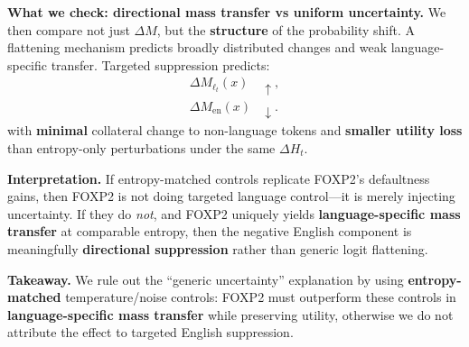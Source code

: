 \begin{itemize}[leftmargin=1.5em]
\begin{description}
\vspace{4pt}
\textbf{What we check: directional mass transfer vs uniform uncertainty.}
We then compare not just $\Delta M$, but the \textbf{structure} of the probability shift. A flattening mechanism predicts broadly distributed changes and weak language-specific transfer. Targeted suppression predicts:
\[
\begin{aligned}
\Delta M_{\ell_t}(x) &\uparrow,\\
\Delta M_{\mathrm{en}}(x) &\downarrow.
\end{aligned}
\]
with \textbf{minimal} collateral change to non-language tokens and \textbf{smaller utility loss} than entropy-only perturbations under the same $\Delta H_t$.

\vspace{3pt}
\textbf{Interpretation.}
If entropy-matched controls replicate FOXP2’s defaultness gains, then FOXP2 is not doing targeted language control—it is merely injecting uncertainty. If they do \emph{not}, and FOXP2 uniquely yields \textbf{language-specific mass transfer} at comparable entropy, then the negative English component is meaningfully \textbf{directional suppression} rather than generic logit flattening.

\vspace{3pt}
\textbf{Takeaway.} We rule out the “generic uncertainty” explanation by using \textbf{entropy-matched} temperature/noise controls: FOXP2 must outperform these controls in \textbf{language-specific mass transfer} while preserving utility, otherwise we do not attribute the effect to targeted English suppression.
\end{description}









\end{itemize}
